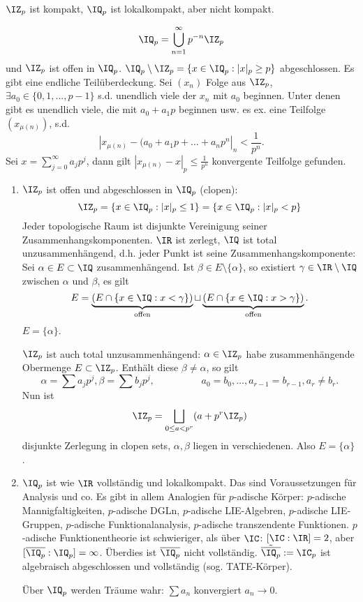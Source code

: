 \renewcommand{\lecdate}{20.01.2015}

\begin{Fakt}
$\IZ_p$ ist kompakt, $\IQ_p$ ist lokalkompakt, aber nicht kompakt.
\end{Fakt}

\begin{Beweis}
\[\IQ_p=\bigcup_{n=1}^\infty p^{-n}\IZ_p\]
und $\IZ_p$ ist offen in $\IQ_p$. $\IQ_p\setminus\IZ_p=\{ x\in\IQ_p : |x|_p\geq p\}$ abgeschlossen. Es gibt eine endliche Teilüberdeckung. Sei $(x_n)$ Folge aus $\IZ_p$, $\exists a_0\in\{ 0,1,\ldots,p-1\}$ s.d. unendlich viele der $x_n$ mit $a_0$ beginnen. Unter denen gibt es unendlich viele, die mit $a_0+a_1p$ beginnen usw. \folge es ex. eine Teilfolge $(x_{\mu(n)})$, s.d.
\[ |x_{\mu(n)}-(a_0+a_1p+\ldots+a_np^n|_n<\frac{1}{p^n}.\]
Sei $x=\sum_{j=0}^\infty a_jp^j$, dann gilt $|x_{\mu(n)}-x|_p\leq \frac{1}{p^n}$ \folge konvergente Teilfolge gefunden.
\end{Beweis}

\begin{Bemerkung}
\begin{enumerate}
\item $\IZ_p$ ist offen und abgeschlossen in $\IQ_p$ (clopen):
\[ \IZ_p=\{ x\in\IQ_p : |x|_p\leq 1\}=\{ x\in\IQ_p : |x|_p< p\}\]
Jeder topologische Raum ist disjunkte Vereinigung seiner Zusammenhangskomponenten. $\IR$ ist zerlegt, $\IQ$ ist total unzusammenhängend, d.h. jeder Punkt ist seine Zusammenhangskomponente:
Sei $\alpha\in E\subset\IQ$ zusammenhängend. Ist $\beta\in E\setminus\{\alpha\}$, so existiert $\gamma\in\IR\setminus\IQ$ zwischen $\alpha$ und $\beta$, es gilt 
\[ E=\underbrace{(E\cap \{ x\in\IQ : x<\gamma\})}_{\text{offen}} \sqcup \underbrace{(E\cap \{ x\in\IQ : x>\gamma\})}_{\text{offen}}.\]
\folge $E=\{\alpha\}$.

$\IZ_p$ ist auch total unzusammenhängend:
$\alpha\in\IZ_p$ habe zusammenhängende Obermenge $E\subset\IZ_p$. Enthält diese $\beta\neq\alpha$, so gilt
\[ \alpha=\sum a_jp^j, \beta=\sum b_jp^j,\hspace{2cm} a_0=b_0,\ldots,a_{r-1}=b_{r-1}, a_r\neq b_r.\]
Nun ist \[ \IZ_p=\bigsqcup_{0\leq a<p^r}(a+p^r\IZ_p)\]
disjunkte Zerlegung in clopen sets, $\alpha, \beta$ liegen in verschiedenen. Also $E=\{\alpha\}$.
\item $\IQ_p$ ist wie $\IR$ vollständig und lokalkompakt. Das sind Voraussetzungen für Analysis und co. Es gibt in allem Analogien für $p$-adische Körper: $p$-adische Mannigfaltigkeiten, $p$-adische DGLn, $p$-adische LIE-Algebren, $p$-adische LIE-Gruppen, $p$-adische Funktionalanalysis, $p$-adische transzendente Funktionen. $p$-adische Funktionentheorie ist schwieriger, als über $\IC$: $[\IC:\IR]=2$, aber $[\overline{\IQ_p}:\IQ_p]=\infty$. Überdies ist $\overline{\IQ_p}$ nicht vollständig. $\tilde{\overline{\IQ_p}}:=\IC_p$ ist algebraisch abgeschlossen und vollständig (sog. TATE-Körper).

Über $\IQ_p$ werden Träume wahr: $\sum a_n$ konvergiert \gdw $a_n\rightarrow 0$.
\end{enumerate}
\end{Bemerkung}

